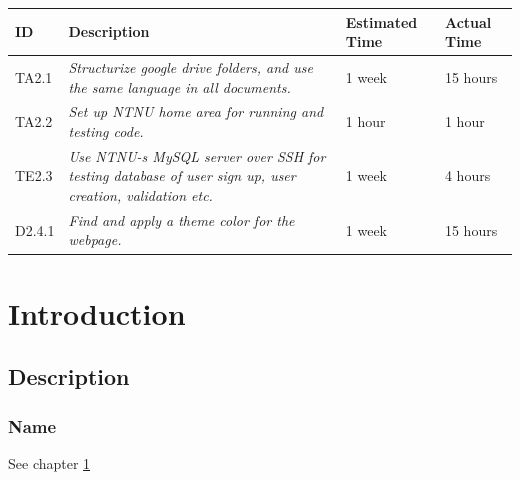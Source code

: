 \documentclass[11pt]{report}
\begin{document}
\begin{minipage}{\linewidth}
\setlength{\tabcolsep}{12pt}
\centering
{}
\begin{tabular}{|p{1cm}|p{4cm}|p{2cm}|p{2cm}|}
\hline
\cellcolor{gray!25} ID & \cellcolor{gray!25} Description & \cellcolor{gray!25} Estimated Time & \cellcolor{gray!25} Actual Time \\
\hline
TA2.1 & \it{Structurize google drive folders, and use the same language in all documents.} & 1 week & 15 hours \\
TA2.2 & \it{Set up NTNU home area for running and testing code.} & 1 hour & 1 hour \\
TE2.3 & \it{Use NTNU-s MySQL server over SSH for testing database of user sign up, user creation, validation etc. } & 1 week & 4 hours \\
D2.4.1 & \it{Find and apply a theme color for the webpage. } & 1 week & 15 hours \\
\hline
\end{tabular}
\end{minipage}



\chapter{Introduction}
\label{chap:Intro}

\section{Description}
\label{sec:IntroDescr}

\subsection{Name}
\label{subsec:IntroDescrName}

\label{fig:FigName}

\label{tab:TabName}

See chapter \ref{chap:Intro}
\end{document}
